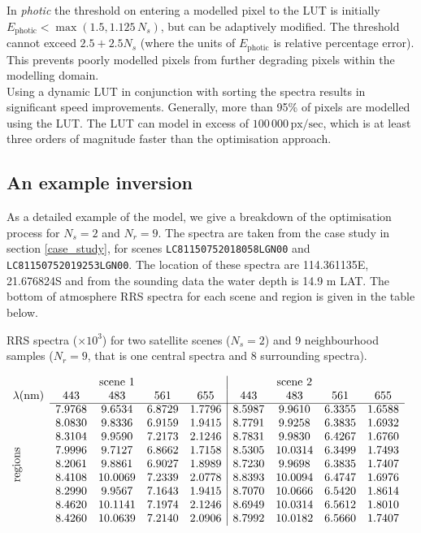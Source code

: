 \documentclass[12pt]{article}
\numberwithin{equation}{section}
\begin{document}
In \textit{photic} the threshold on entering a modelled pixel to the LUT is initially 
$E_{\text{photic}} < \max\left(1.5, 1.125\,N_s\right)$, but can be adaptively modified. The 
threshold cannot exceed $2.5 + 2.5 N_s$ (where the units of $E_{\text{photic}}$ is 
relative percentage error). This prevents poorly modelled pixels from further degrading 
pixels within the modelling domain. \\

Using a dynamic LUT in conjunction with sorting the spectra results in significant speed 
improvements. Generally, more than 95\% of pixels are modelled using the LUT. The LUT can 
model in excess of $100\,000\,\text{px}/\text{sec}$, which is at least three orders of 
magnitude faster than the optimisation approach. 

	\subsection{An example inversion}

As a detailed example of the model, we give a breakdown of the optimisation 
process for $N_s = 2$ and $N_r = 9$. The spectra are taken from the case study in 
section \ref{case_study}, for scenes \texttt{LC81150752018058LGN00} and 
\texttt{LC81150752019253LGN00}. The location of these spectra are 114.361135E, 
21.676824S and from the sounding data the water depth is 14.9 m LAT. The bottom 
of atmosphere RRS spectra for each scene and region is given in the table below. 

\begin{table}[H]
\centering
\caption{RRS spectra ($\times 10^3$) for two satellite scenes ($N_s=2$) and 9 
neighbourhood samples ($N_r = 9$, that is one central spectra and 8 surrounding 
spectra).}
$
\begin{array}{l c c c c | c c c c}
& & \text{scene 1} & &  & & \text{scene 2} & &  \\
\lambda(\text{nm}) & 443     &     483 &     561 &     655 &     443 &     483 &     561 &     655 \\
\cline{2-9}
& 7.9768 & 9.6534 & 6.8729 & 1.7796 & 8.5987 & 9.9610 & 6.3355 & 1.6588 \\ 
& 8.0830 & 9.8336 & 6.9159 & 1.9415 & 8.7791 & 9.9258 & 6.3835 & 1.6932 \\
& 8.3104 & 9.9590 & 7.2173 & 2.1246 & 8.7831 & 9.9830 & 6.4267 & 1.6760 \\
& 7.9996 & 9.7127 & 6.8662 & 1.7158 & 8.5305 & 10.0314 & 6.3499 & 1.7493\\
\smash{\rotatebox[origin=c]{90}{regions}} & 8.2061 & 9.8861 & 6.9027 & 1.8989 & 8.7230 & 9.9698 & 6.3835 & 1.7407 \\
& 8.4108 & 10.0069 & 7.2339 & 2.0778 & 8.8393 & 10.0094 & 6.4747 & 1.6976 \\
& 8.2990 & 9.9567 & 7.1643 & 1.9415 & 8.7070 & 10.0666 & 6.5420 & 1.8614 \\
& 8.4620 & 10.1141 & 7.1974 & 2.1246 & 8.6949 & 10.0314 & 6.5612 & 1.8010 \\
& 8.4260 & 10.0639 & 7.2140 & 2.0906 & 8.7992 & 10.0182 & 6.5660 & 1.7407 \\
\end{array}
$
\end{table}
\end{document}
